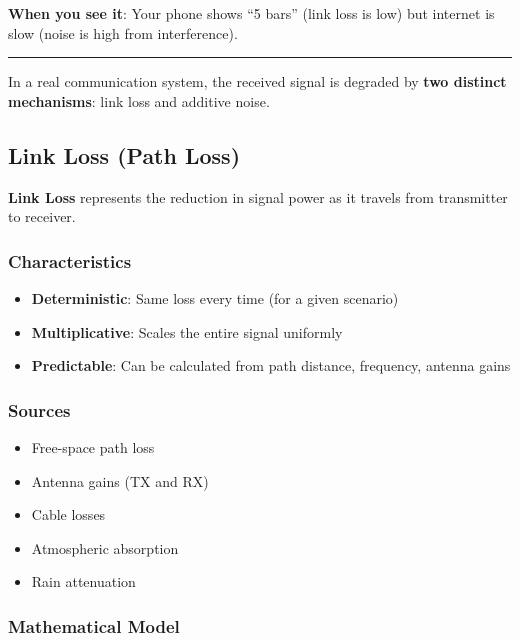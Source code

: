 \textbf{When you see it}: Your phone shows ``5 bars'' (link loss is low)
but internet is slow (noise is high from interference).

\begin{center}\rule{0.5\linewidth}{0.5pt}\end{center}

In a real communication system, the received signal is degraded by
\textbf{two distinct mechanisms}: link loss and additive noise.

\subsection{Link Loss (Path Loss)}\label{link-loss-path-loss}

\textbf{Link Loss} represents the reduction in signal power as it
travels from transmitter to receiver.

\subsubsection{Characteristics}\label{characteristics}

\begin{itemize}
\tightlist
\item
  \textbf{Deterministic}: Same loss every time (for a given scenario)
\item
  \textbf{Multiplicative}: Scales the entire signal uniformly
\item
  \textbf{Predictable}: Can be calculated from path distance, frequency,
  antenna gains
\end{itemize}

\subsubsection{Sources}\label{sources}

\begin{itemize}
\tightlist
\item
  Free-space path loss
\item
  Antenna gains (TX and RX)
\item
  Cable losses
\item
  Atmospheric absorption
\item
  Rain attenuation
\end{itemize}

\subsubsection{Mathematical Model}\label{mathematical-model}

